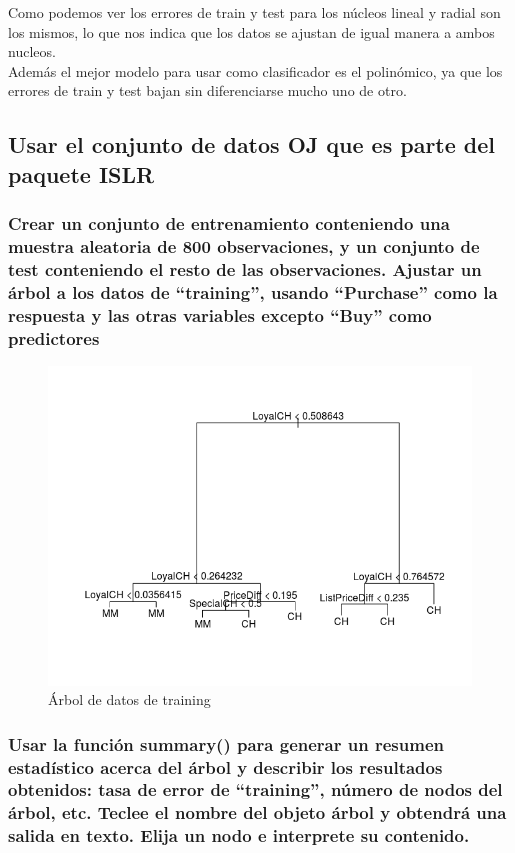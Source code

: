 Como podemos ver los errores de train y test para los núcleos lineal y radial son los mismos, lo que nos indica que los datos se ajustan de igual manera a ambos nucleos.\\

Además el mejor modelo para usar como clasificador es el polinómico, ya que los errores de train y test bajan sin diferenciarse mucho uno de otro. 

\subsection{Usar el conjunto de datos OJ que es parte del paquete ISLR}

\subsubsection{Crear un conjunto de entrenamiento conteniendo una muestra aleatoria de 800 observaciones, y un conjunto de test conteniendo el resto de las observaciones. Ajustar un árbol a los datos de ``training'', usando ``Purchase'' como la respuesta y las otras variables excepto ``Buy'' como predictores}

\begin{figure}[H]
\centering
\includegraphics[scale=0.50]{ej2-1.png}
\caption{Árbol de datos de training}
\label{}
\end{figure}

\subsubsection{Usar la función summary() para generar un resumen estadístico acerca del árbol y describir los resultados obtenidos: tasa de error de “training”, número de nodos del árbol, etc. Teclee el nombre del objeto árbol y obtendrá una salida en texto. Elija un nodo e interprete su contenido.}

